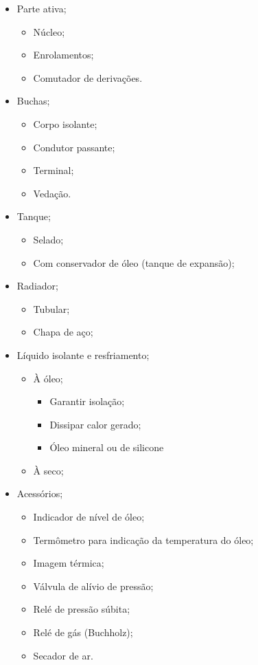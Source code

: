 \begin{itemize}
    \item Parte ativa;
    \begin{itemize}
        \item Núcleo;
        \item Enrolamentos;
        \item Comutador de derivações.
    \end{itemize}
    \item Buchas;
    \begin{itemize}
        \item Corpo isolante;
        \item Condutor passante;
        \item Terminal;
        \item Vedação.
    \end{itemize}
    \item Tanque;
    \begin{itemize}
        \item Selado;
        \item Com conservador de óleo (tanque de expansão);
    \end{itemize}
    \item Radiador;
    \begin{itemize}
        \item Tubular;
        \item Chapa de aço;
    \end{itemize}
    \item Líquido isolante e resfriamento;
    \begin{itemize}
        \item À óleo;
        \begin{itemize}
            \item Garantir isolação;
            \item Dissipar calor gerado;
            \item Óleo mineral ou de silicone
        \end{itemize}
        \item À seco;
    \end{itemize}
    \item Acessórios;
    \begin{itemize}
        \item Indicador de nível de óleo;
        \item Termômetro para indicação da temperatura do óleo;
        \item Imagem térmica;
        \item Válvula de alívio de pressão;
        \item Relé de pressão súbita;
        \item Relé de gás (Buchholz);
        \item Secador de ar.
    \end{itemize}
\end{itemize}


